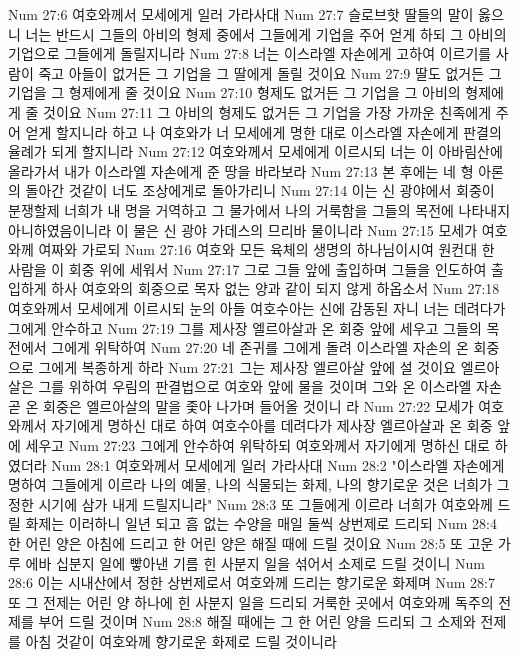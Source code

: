Num 27:6  여호와께서 모세에게 일러 가라사대
Num 27:7  슬로브핫 딸들의 말이 옳으니 너는 반드시 그들의 아비의 형제 중에서 그들에게 기업을 주어 얻게 하되 그 아비의 기업으로 그들에게 돌릴지니라
Num 27:8  너는 이스라엘 자손에게 고하여 이르기를 사람이 죽고 아들이 없거든 그 기업을 그 딸에게 돌릴 것이요
Num 27:9  딸도 없거든 그 기업을 그 형제에게 줄 것이요
Num 27:10  형제도 없거든 그 기업을 그 아비의 형제에게 줄 것이요
Num 27:11  그 아비의 형제도 없거든 그 기업을 가장 가까운 친족에게 주어 얻게 할지니라 하고 나 여호와가 너 모세에게 명한 대로 이스라엘 자손에게 판결의 율례가 되게 할지니라
Num 27:12  여호와께서 모세에게 이르시되 너는 이 아바림산에 올라가서 내가 이스라엘 자손에게 준 땅을 바라보라
Num 27:13  본 후에는 네 형 아론의 돌아간 것같이 너도 조상에게로 돌아가리니
Num 27:14  이는 신 광야에서 회중이 분쟁할제 너희가 내 명을 거역하고 그 물가에서 나의 거룩함을 그들의 목전에 나타내지 아니하였음이니라 이 물은 신 광야 가데스의 므리바 물이니라
Num 27:15  모세가 여호와께 여짜와 가로되
Num 27:16  여호와 모든 육체의 생명의 하나님이시여 원컨대 한 사람을 이 회중 위에 세워서
Num 27:17  그로 그들 앞에 출입하며 그들을 인도하여 출입하게 하사 여호와의 회중으로 목자 없는 양과 같이 되지 않게 하옵소서
Num 27:18  여호와께서 모세에게 이르시되 눈의 아들 여호수아는 신에 감동된 자니 너는 데려다가 그에게 안수하고
Num 27:19  그를 제사장 엘르아살과 온 회중 앞에 세우고 그들의 목전에서 그에게 위탁하여
Num 27:20  네 존귀를 그에게 돌려 이스라엘 자손의 온 회중으로 그에게 복종하게 하라
Num 27:21  그는 제사장 엘르아살 앞에 설 것이요 엘르아살은 그를 위하여 우림의 판결법으로 여호와 앞에 물을 것이며 그와 온 이스라엘 자손 곧 온 회중은 엘르아살의 말을 좇아 나가며 들어올 것이니 라
Num 27:22  모세가 여호와께서 자기에게 명하신 대로 하여 여호수아를 데려다가 제사장 엘르아살과 온 회중 앞에 세우고
Num 27:23  그에게 안수하여 위탁하되 여호와께서 자기에게 명하신 대로 하였더라
Num 28:1  여호와께서 모세에게 일러 가라사대
Num 28:2  "이스라엘 자손에게 명하여 그들에게 이르라 나의 예물, 나의 식물되는 화제, 나의 향기로운 것은 너희가 그 정한 시기에 삼가 내게 드릴지니라"
Num 28:3  또 그들에게 이르라 너희가 여호와께 드릴 화제는 이러하니 일년 되고 흠 없는 수양을 매일 둘씩 상번제로 드리되
Num 28:4  한 어린 양은 아침에 드리고 한 어린 양은 해질 때에 드릴 것이요
Num 28:5  또 고운 가루 에바 십분지 일에 빻아낸 기름 힌 사분지 일을 섞어서 소제로 드릴 것이니
Num 28:6  이는 시내산에서 정한 상번제로서 여호와께 드리는 향기로운 화제며
Num 28:7  또 그 전제는 어린 양 하나에 힌 사분지 일을 드리되 거룩한 곳에서 여호와께 독주의 전제를 부어 드릴 것이며
Num 28:8  해질 때에는 그 한 어린 양을 드리되 그 소제와 전제를 아침 것같이 여호와께 향기로운 화제로 드릴 것이니라
